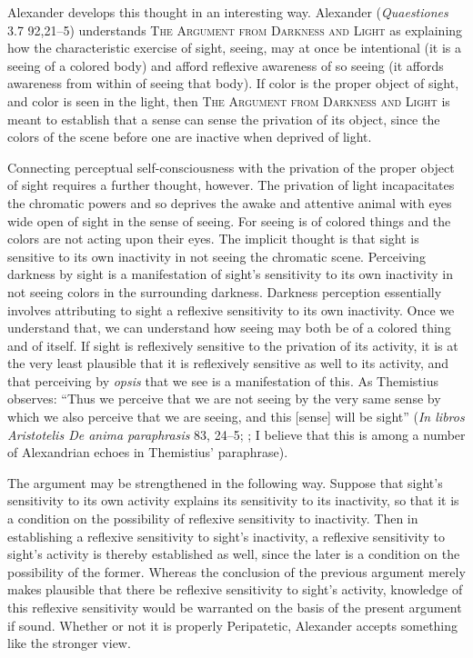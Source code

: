 Alexander develops this thought in an interesting way. Alexander (\emph{Quaestiones} 3.7 92,21–5) understands \textsc{The Argument from Darkness and Light} as explaining how the characteristic exercise of sight, seeing, may at once be intentional (it is a seeing of a colored body) and afford reflexive awareness of so seeing (it affords awareness from within of seeing that body). If color is the proper object of sight, and color is seen in the light, then \textsc{The Argument from Darkness and Light} is meant to establish that a sense can sense the privation of its object, since the colors of the scene before one are inactive when deprived of light. 

Connecting perceptual self-consciousness with the privation of the proper object of sight requires a further thought, however. The privation of light incapacitates the chromatic powers and so deprives the awake and attentive animal with eyes wide open of sight in the sense of seeing. For seeing is of colored things and the colors are not acting upon their eyes. The implicit thought is that sight is sensitive to its own inactivity in not seeing the chromatic scene. Perceiving darkness by sight is a manifestation of sight's sensitivity to its own inactivity in not seeing colors in the surrounding darkness. Darkness perception essentially involves attributing to sight a reflexive sensitivity to its own inactivity. Once we understand that, we can understand how seeing may both be of a colored thing and of itself. If sight is reflexively sensitive to the privation of its activity, it is at the very least plausible that it is reflexively sensitive as well to its activity, and that perceiving by \emph{opsis} that we see is a manifestation of this. As Themistius observes: ``Thus we perceive that we are not seeing by the very same sense by which we also perceive that we are seeing, and this [sense] will be sight'' (\emph{In libros Aristotelis De anima paraphrasis} 83, 24–5; \citealt[105]{Todd:1996aa}; I believe that this is among a number of Alexandrian echoes in Themistius' paraphrase). 

The argument may be strengthened in the following way. Suppose that sight's sensitivity to its own activity explains its sensitivity to its inactivity, so that it is a condition on the possibility of reflexive sensitivity to inactivity. Then in establishing a reflexive sensitivity to sight's inactivity, a reflexive sensitivity to sight's activity is thereby established as well, since the later is a condition on the possibility of the former. Whereas the conclusion of the previous argument merely makes plausible that there be reflexive sensitivity to sight's activity, knowledge of this reflexive sensitivity would be warranted on the basis of the present argument if sound. Whether or not it is properly Peripatetic, Alexander accepts something like the stronger view.

